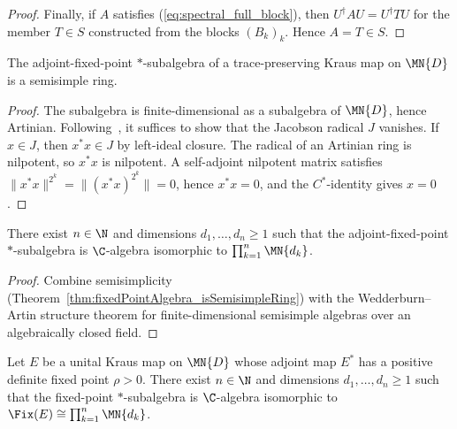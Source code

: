 \begin{proof}
    Finally, if $A$ satisfies (\ref{eq:spectral_full_block}), then
    $U^\dagger AU=U^\dagger TU$ for the member $T\in S$ constructed from
    the blocks $(B_k)_k$. Hence $A=T\in S$.
\end{proof}

\begin{theorem}%
    \label{thm:fixedPointAlgebra_isSemisimpleRing}
    \leanok
    The adjoint-fixed-point $*$-subalgebra of a trace-preserving Kraus map
    on $\MN{D}$ is a semisimple ring.
\end{theorem}

\begin{proof}
    \leanok
    The subalgebra is finite-dimensional as a subalgebra of $\MN{D}$, hence
    Artinian. Following~\cite[Theorem~6.14]{Wolf2012Quantum}, it suffices to
    show that the Jacobson radical $J$ vanishes. If $x\in J$, then
    $x^*x\in J$ by left-ideal closure. The radical of an Artinian ring is
    nilpotent, so $x^*x$ is nilpotent. A self-adjoint nilpotent matrix
    satisfies
    $\lVert x^*x\rVert^{2^k}=\lVert(x^*x)^{2^k}\rVert=0$, hence
    $x^*x=0$, and the $C^*$-identity gives $x=0$.
\end{proof}

\begin{theorem}%
    \label{thm:fixedPointAlgebra_wedderburnArtin}
    \leanok
    There exist $n\in\N$ and dimensions $d_1,\ldots,d_n\geq1$ such that
    the adjoint-fixed-point $*$-subalgebra is $\C$-algebra isomorphic to
    $\prod_{k=1}^{n}\MN{d_k}$.
\end{theorem}

\begin{proof}
    \leanok
    Combine semisimplicity
    (Theorem~\ref{thm:fixedPointAlgebra_isSemisimpleRing}) with the
    Wedderburn--Artin structure theorem for finite-dimensional semisimple
    algebras over an algebraically closed field.
\end{proof}

\begin{theorem}%
    \label{thm:fixedPointsStarSubalgebra_exists_algEquiv_pi_matrix}
    \leanok
    Let $E$ be a unital Kraus map on $\MN{D}$ whose adjoint map $E^*$ has a
    positive definite fixed point $\rho>0$. There exist $n\in\N$ and
    dimensions $d_1,\ldots,d_n\geq1$ such that the fixed-point
    $*$-subalgebra is $\C$-algebra isomorphic to
    $\Fix(E)\cong\prod_{k=1}^{n}\MN{d_k}$.
\end{theorem}

